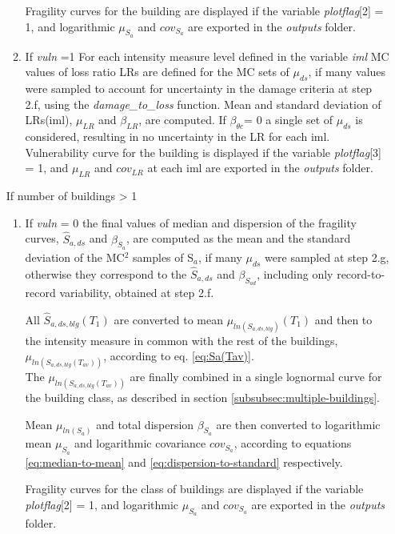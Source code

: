 \begin{enumerate}
\begin{enumerate}
Fragility curves for the building are displayed if the variable \textit{plotflag}[2] = 1, and logarithmic $\mu_{S_a}$ and $cov_{S_a}$ are exported in the \textit{outputs} folder.

\item 
If \textit{vuln} =1
For each intensity measure level defined in the variable \textit{iml} MC values of loss ratio LRs are defined for the MC sets of $\mu_{ds}$, if many values were sampled to account for uncertainty in the damage criteria at step 2.f, using the \textit{damage\_to\_loss} function. Mean and standard deviation of LRs(iml), $\mu_{LR}$ and $\beta_{LR}$, are computed. If $\beta_{\theta c}$= 0 a single set of $\mu_{ds}$ is considered, resulting in no uncertainty in the LR for each iml.\\

Vulnerability curve for the building is displayed if the variable \textit{plotflag}[3] = 1, and $\mu_{LR}$ and $cov_{LR}$ at each iml are exported in the \textit{outputs} folder.\\

\end{enumerate}

If number of buildings > 1\\
\begin{enumerate}
\item If \textit{vuln} = 0
the final values of median and dispersion of the fragility curves, $\hat{S}_{a,ds}$ and $\beta_{S_a}$, are computed as the mean and the standard deviation of the MC$^2$ samples of S$_a$, if many $\mu_{ds}$ were sampled at step 2.g, otherwise they correspond to the $\hat{S}_{a,ds}$ and $\beta_{S_{a d}}$, including only record-to-record variability, obtained at step 2.f.

All $\hat{S}_{a, ds, blg}(T_1)$ are converted to mean $\mu_{ln(S_{a, ds, blg})}(T_1)$ and then to the intensity measure in common with the rest of the buildings, $\mu_{ln(S_{a, ds, blg}(T_{av}))}$, according to eq. \ref{eq:Sa(Tav)}.\\
The $\mu_{ln(S_{a, ds, blg}(T_{av}))}$ are finally combined in a single lognormal curve for the building class, as described in section \ref{subsubsec:multiple-buildings}. 

Mean $\mu_{ln(S_{a})}$ and total dispersion $\beta_{S_a}$ are then converted to logarithmic mean $\mu_{S_a}$ and logarithmic covariance $cov_{S_a}$, according to equations \ref{eq:median-to-mean} and \ref{eq:dispersion-to-standard} respectively.

Fragility curves for the class of buildings are displayed if the variable \textit{plotflag}[2] = 1, and logarithmic $\mu_{S_a}$ and $cov_{S_a}$ are exported in the \textit{outputs} folder.


\end{enumerate}
\end{enumerate}
